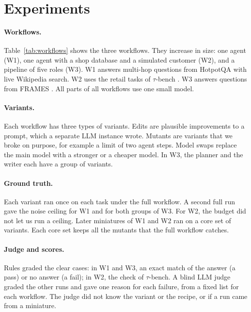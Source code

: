 \section{Experiments}
\label{sec:setup}



\paragraph{Workflows.}
Table~\ref{tab:workflows} shows the three workflows. They increase in size: one agent (W1), one
agent with a shop database and a simulated customer (W2), and a pipeline of five roles (W3). W1
answers multi-hop questions from HotpotQA \citep{yang2018hotpotqa} with live Wikipedia search. W2
uses the retail tasks of $\tau$-bench \citep{yao2024taubench}. W3 answers questions from FRAMES
\citep{krishna2024fact}. All parts of all workflows use one small model.

\paragraph{Variants.}
Each workflow has three types of variants. Edits are plausible improvements to a prompt, which a
separate LLM instance wrote. Mutants are variants that we broke on purpose, for example a limit of
two agent steps. Model swaps replace the main model with a stronger or a cheaper model. In W3, the
planner and the writer each have a group of variants.

\paragraph{Ground truth.}
Each variant ran once on each task under the full workflow. A second full run gave the noise
ceiling for W1 and for both groups of W3. For W2, the budget did not let us run a ceiling. Later
miniatures of W1 and W2 ran on a core set of variants. Each core set keeps all the mutants that the
full workflow catches.

\paragraph{Judge and scores.}
Rules graded the clear cases: in W1 and W3, an exact match of the answer (a pass) or no answer
(a fail); in W2, the check of $\tau$-bench. A blind LLM judge graded the other runs and gave one reason for each failure,
from a fixed list for each workflow. The judge did not know the variant or the recipe, or if a run
came from a miniature.

